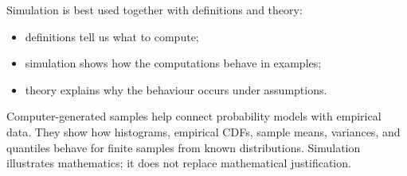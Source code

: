Simulation is best used together with definitions and theory:
\begin{itemize}
    \item definitions tell us what to compute;
    \item simulation shows how the computations behave in examples;
    \item theory explains why the behaviour occurs under assumptions.
\end{itemize}

\begin{summarybox}
Computer-generated samples help connect probability models with empirical data.
They show how histograms, empirical CDFs, sample means, variances, and quantiles
behave for finite samples from known distributions. Simulation illustrates
mathematics; it does not replace mathematical justification.
\end{summarybox}
